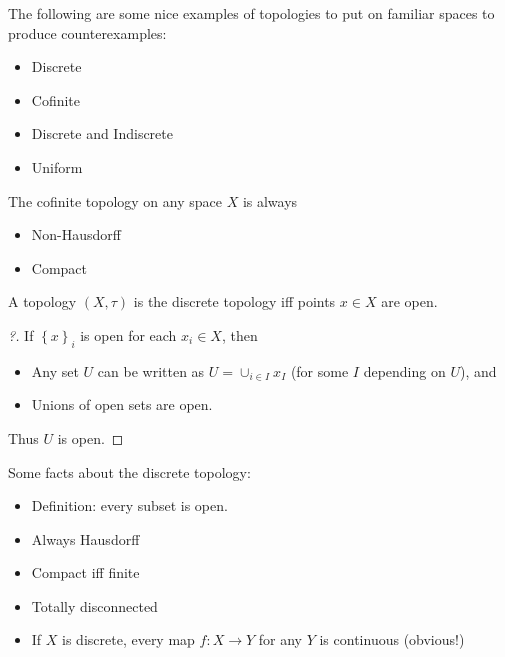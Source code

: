 \begin{example}

The following are some nice examples of topologies to put on familiar
spaces to produce counterexamples:

\begin{itemize}
\tightlist
\item
  Discrete
\item
  Cofinite
\item
  Discrete and Indiscrete
\item
  Uniform
\end{itemize}

\end{example}

\begin{example}

The cofinite topology on any space \(X\) is always

\begin{itemize}
\tightlist
\item
  Non-Hausdorff
\item
  Compact
\end{itemize}

\end{example}

\begin{proposition}

A topology \((X, \tau)\) is the discrete topology iff points \(x\in X\)
are open.

\end{proposition}

\begin{proof}[?]

If \(\left\{{x}\right\}_i\) is open for each \(x_i \in X\), then

\begin{itemize}
\tightlist
\item
  Any set \(U\) can be written as \(U = \cup_{i\in I} x_I\) (for some
  \(I\) depending on \(U\)), and
\item
  Unions of open sets are open.
\end{itemize}

Thus \(U\) is open.

\end{proof}

\begin{example}

Some facts about the discrete topology:

\begin{itemize}
\tightlist
\item
  Definition: every subset is open.
\item
  Always Hausdorff
\item
  Compact iff finite
\item
  Totally disconnected
\item
  If \(X\) is discrete, every map \(f:X\to Y\) for any \(Y\) is
  continuous (obvious!)
\end{itemize}

\end{example}

